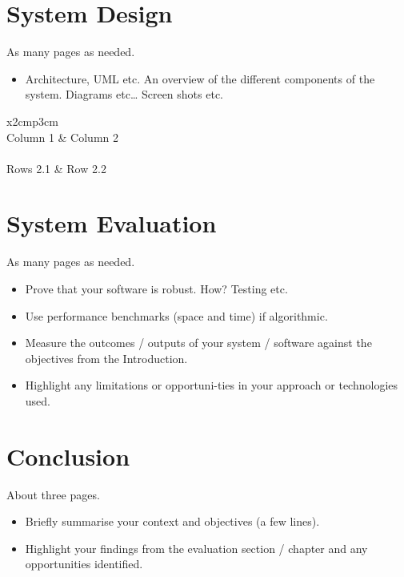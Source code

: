 \chapter{System Design}
As many pages as needed.
\begin{itemize}
\item Architecture, UML etc. An overview of the different components of the system. Diagrams etc… Screen shots etc.
\end{itemize}

\begin{table}[h]
  \centering
  \begin{tabular}{x{2cm}p{3cm}}
    \toprule \\
    Column 1 & Column 2 \\
    \midrule \\
    Rows 2.1 & Row 2.2 \\
    \bottomrule
  \end{tabular}
  \caption{A table.}
  \label{table:mytable}
\end{table}

\chapter{System Evaluation}
As many pages as needed.
\begin{itemize}
\item Prove that your software is robust. How? Testing etc. 
\item Use performance benchmarks (space and time) if algorithmic.
\item Measure the outcomes / outputs of your system / software against the objectives from the Introduction.
\item Highlight any limitations or opportuni-ties in your approach or technologies used.
\end{itemize}

\chapter{Conclusion}
About three pages.

\begin{itemize}
\item Briefly summarise your context and objectives (a few lines).
\item Highlight your findings from the evaluation section / chapter and any opportunities identified.
\end{itemize}